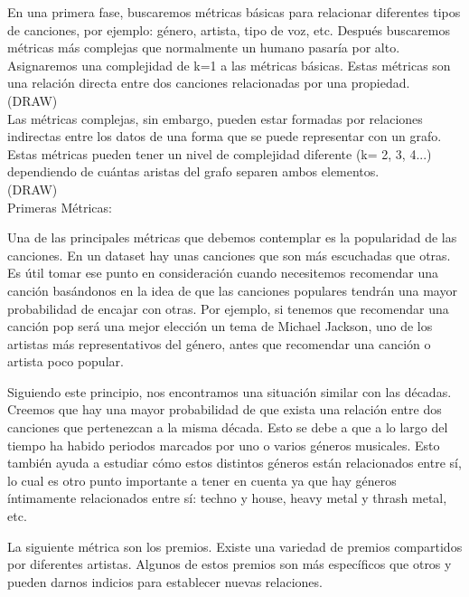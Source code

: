 En una primera fase, buscaremos métricas básicas para relacionar diferentes tipos de canciones, por ejemplo: género, artista, tipo de voz, etc. Después buscaremos métricas más complejas que normalmente un humano pasaría por alto. Asignaremos una complejidad de k=1 a las métricas básicas. Estas métricas son una relación directa entre dos canciones relacionadas por una propiedad.\\

(DRAW)\\

Las métricas complejas, sin embargo, pueden estar formadas por relaciones indirectas entre los datos de una forma que se puede representar con un grafo. Estas métricas pueden tener un nivel de complejidad diferente (k= 2, 3, 4...) dependiendo de cuántas aristas del grafo separen ambos elementos.\\

(DRAW)\\


Primeras Métricas:

Una de las principales métricas que debemos contemplar es la popularidad de las canciones. En un dataset hay unas canciones que son más escuchadas que otras. Es útil tomar ese punto en consideración cuando necesitemos recomendar una canción basándonos en la idea de que las canciones populares tendrán una mayor probabilidad de encajar con otras. Por ejemplo, si tenemos que recomendar una canción pop será una mejor elección un tema de Michael Jackson, uno de los artistas más representativos del género, antes que recomendar una canción o artista poco popular.

Siguiendo este principio, nos encontramos una situación similar con las décadas. Creemos que hay una mayor probabilidad de que exista una relación entre dos canciones que pertenezcan a la misma década. Esto se debe a que a lo largo del tiempo ha habido periodos marcados por uno o varios géneros musicales. Esto también ayuda a estudiar cómo estos distintos géneros están relacionados entre sí, lo cual es otro punto importante a tener en cuenta ya que hay géneros íntimamente relacionados entre sí: techno y house, heavy metal y thrash metal, etc.

La siguiente métrica son los premios. Existe una variedad de premios compartidos por diferentes artistas. Algunos de estos premios son más específicos que otros y pueden darnos indicios para establecer nuevas relaciones.